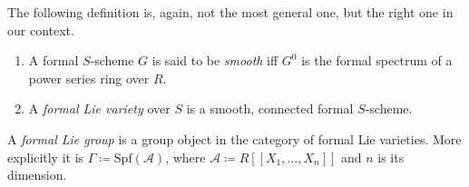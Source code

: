 \documentclass[../Main]{subfiles}
\begin{document}
The following definition is, again, not the most general one, but
the right one in our context.
\begin{defn}\leavevmode\vspace{-1\baselineskip}
\begin{enumerate}
	\item A formal $S$-scheme $G$ is said to be {\em smooth} iff
		$G^0$ is the formal spectrum of a power series ring over $R$.
	\item A {\em formal Lie variety} over $S$ is a smooth, connected formal $S$-scheme.
\end{enumerate}
\end{defn}

\begin{defn}\label{defn:FormalSchemeFormalLieGroup}
	A {\em formal Lie group} is a group object in the category of
	formal Lie varieties.
	More explicitly it is $\Gamma \coloneqq \mathrm{Spf}\left( \mathscr{A} \right)$,
	where $\mathscr{A} \coloneqq R [\![ X_1, \ldots, X_{ n } ]\!]$
	and $n$ is its dimension. 
\end{defn}
\end{document}
